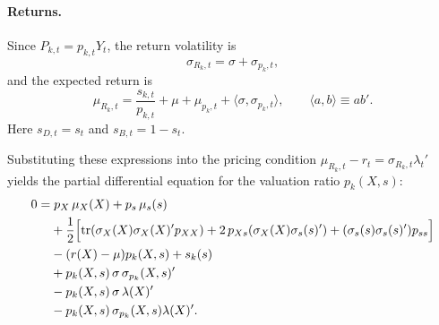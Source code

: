 \documentclass[11pt,english]{article}
\begin{document}
\paragraph{Returns.}

Since $P_{k,t}=p_{k,t}Y_t$, the return volatility is
\begin{equation}
\sigma_{R_k,t} = \sigma + \sigma_{p_k,t},
\end{equation}
and the expected return is
\begin{equation}
\mu_{R_k,t}
=
\frac{s_{k,t}}{p_{k,t}}
+
\mu
+
\mu_{p_k,t}
+
\langle \sigma, \sigma_{p_k,t} \rangle,
\qquad
\langle a,b\rangle \equiv a b'.
\end{equation}
Here $s_{D,t}=s_t$ and $s_{B,t}=1-s_t$.

Substituting these expressions into the pricing condition
$\mu_{R_k,t}-r_t=\sigma_{R_k,t}\lambda_t'$ yields the partial differential equation for the valuation ratio $p_k(X,s)$:
\begin{align}
0=&\;
p_X\,\mu_X(X)+p_s\,\mu_s(s) \notag\\
&+
\frac12
\Big[
\mathrm{tr}(\sigma_X(X)\sigma_X(X)'p_{XX})
+
2\,p_{Xs}(\sigma_X(X)\sigma_s(s)')
+
(\sigma_s(s)\sigma_s(s)')p_{ss}
\Big] \notag\\
&-(r(X)-\mu)p_k(X,s)
+
s_k(s) \notag\\
&+
p_k(X,s)\,\sigma\,\sigma_{p_k}(X,s)' \notag\\
&-
p_k(X,s)\,\sigma\,\lambda(X)' \notag\\
&-
p_k(X,s)\,\sigma_{p_k}(X,s)\lambda(X)' .
\end{align}




\newpage
\singlespacing
%
\clearpage

\end{document}
